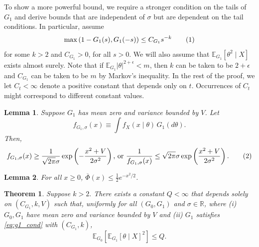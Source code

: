 \documentclass[10pt,a4paper]{amsart}
\newtheorem{lemma}{Lemma}
\newtheorem{theorem}{Theorem}
\newcommand{\E}{\mathbb{E}}
\newcommand{\R}{\mathbb{R}}
\renewcommand{\bar}{\overline}
\newcommand{\bk}[1]{\left[{#1}\right]}
\newcommand\numberthis{\addtocounter{equation}{1}\tag{\theequation}}
\newcommand{\parens}[1]{\left({#1}\right)}
\newcommand{\pr}{\parens}
\begin{document}
To show a more powerful bound, we require a stronger condition on the tails of $G_1$ and
derive bounds that are independent of $\sigma$ but are dependent on the tail conditions.
In particular, assume
\[ \max\pr{1-G_1(s), G_1(-s) }\le C_{G_1} s^{-k} \numberthis\label{eq:g1_cond}
\]
for some $k > 2$ and $C_{G_1} > 0$, for all $s > 0$. We will also assume that $\E
_{G_1}[\theta^2 \mid X]$ exists almost surely. Note that if $\E_{G_1} |\theta|^
{2+\epsilon} < m$, then $k$ can be taken to be $2+\epsilon$ and $C_{G_1}$ can be taken to
be $m$ by Markov's inequality. In the rest of the proof, we let $C_t < \infty$ denote a
positive constant that depends only on $t$. Occurrences of
$C_t$ might correspond to different constant values. 

\begin{lemma}
\label{lemma:jensen_denom}
Suppose $G_1$ has mean zero and variance bounded by $V$. Let \[
f_{G_1, \sigma}(x) \equiv \int f_X(x\mid \theta) \, G_1(d\theta).
\] Then, \[
f_{G_1,\sigma}(x) \ge \frac{1}{\sqrt{2\pi}\sigma} \exp\pr{-\frac{x^2 + V}
{2\sigma^2}}
\text{, or }
\frac{1}{f_{G_1, \sigma}(x)} \le \sqrt{2\pi} \sigma \exp\pr{\frac{x^2 + V}{2\sigma^2}}.
\numberthis \label{eq:jensen_denom}
\]
\end{lemma}

\begin{lemma}
\label{lemma:millsratio}
For all $x \ge 0$, $\bar\Phi(x) \le \frac{1}{2} e^{-x^2/2}$. 
\end{lemma}

\begin{theorem}
\label{thm:max_risk}
Suppose $k > 2.$ There exists a constant $Q < \infty$ that depends solely on $(C_ {G_1},
k, V)$ such that, uniformly for all $(G_0, G_1)$ and $\sigma \in \R$, where (i) $G_0,G_1$
have mean zero and variance bounded by $V$ and (ii) $G_1$ satisfies
\eqref{eq:g1_cond} with $(C_{G_1},
k)$, \[
\E_{G_0}\bk{\E_{G_1}[\theta\mid X]^2} \le Q.
\]
\end{theorem}
\end{document}
